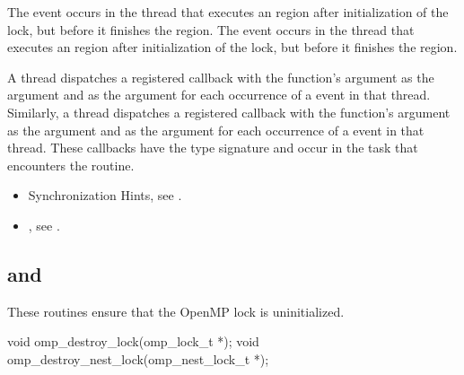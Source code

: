 \events
The  event occurs in the thread that executes an 
 region after initialization of the 
lock, but before it finishes the region. The  
event occurs in the thread that executes an  
region after initialization of the lock, but before it finishes the region.

\tools
A thread dispatches a registered  
callback with the function's  argument as the  argument 
and  as the  argument for each 
occurrence of a  event in that thread. Similarly, 
a thread dispatches a registered  
callback with the function's  argument as the  argument 
and  as the  argument for each 
occurrence of a  event in that thread. These 
callbacks have the type signature 
and occur in the task that encounters the routine.

\crossreferences
\begin{itemize}
\item Synchronization Hints, see .

\item {}, see
.
\end{itemize}



\subsection[\hcode{omp_destroy_lock} and \hcode{omp_destroy_nest_lock}]{ and\\ }
\label{subsec:omp_destroy_lock and omp_destroy_nest_lock}
\summary
These routines ensure that the OpenMP lock is uninitialized.

\format
\begin{ccppspecific}
\begin{ompcFunction}
void omp_destroy_lock(omp_lock_t *);
void omp_destroy_nest_lock(omp_nest_lock_t *);
\end{ompcFunction}
\end{ccppspecific}

